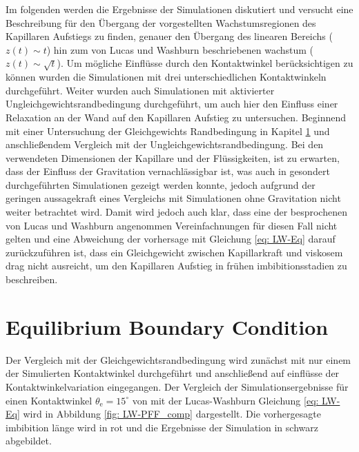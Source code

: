 
Im folgenden werden die Ergebnisse der Simulationen diskutiert und versucht eine Beschreibung für den Übergang der vorgestellten Wachstumsregionen des Kapillaren Aufstiegs zu finden, genauer den Übergang des linearen Bereichs ($z(t)\sim t$) hin zum von Lucas und Washburn beschriebenen wachstum ($z(t)\sim \sqrt{t}$). Um mögliche Einflüsse durch den Kontaktwinkel berücksichtigen zu können wurden die Simulationen mit drei unterschiedlichen Kontaktwinkeln durchgeführt. Weiter wurden auch Simulationen mit aktivierter Ungleichgewichtsrandbedingung durchgeführt, um auch hier den Einfluss einer Relaxation an der Wand auf den Kapillaren Aufstieg zu untersuchen. Beginnend mit einer Untersuchung der Gleichgewichts Randbedingung in Kapitel \ref{sec: EquilibriumBoundaryCondition} und anschließendem Vergleich mit der Ungleichgewichtsrandbedingung.  
Bei den verwendeten Dimensionen der Kapillare und der Flüssigkeiten, ist zu erwarten, dass der Einfluss der Gravitation vernachlässigbar ist, was auch in gesondert durchgeführten Simulationen gezeigt werden konnte, jedoch aufgrund der geringen aussagekraft eines Vergleichs mit Simulationen ohne Gravitation nicht weiter betrachtet wird. Damit wird jedoch auch klar, dass eine der besprochenen von Lucas und Washburn angenommen Vereinfachnungen für diesen Fall nicht gelten und eine Abweichung der vorhersage mit Gleichung \ref{eq: LW-Eq} darauf zurückzuführen ist, dass ein Gleichgewicht zwischen Kapillarkraft und viskosem drag nicht ausreicht, um den Kapillaren Aufstieg in frühen imbibitionsstadien zu beschreiben.

\section{Equilibrium Boundary Condition}
\label{sec: EquilibriumBoundaryCondition}
Der Vergleich mit der Gleichgewichtsrandbedingung wird zunächst mit nur einem der Simulierten Kontaktwinkel durchgeführt und anschließend auf einflüsse der Kontaktwinkelvariation eingegangen. Der Vergleich der Simulationsergebnisse für einen Kontaktwinkel $\theta_{\mathrm{e}}=15^{\circ}$ von mit der Lucas-Washburn Gleichung \ref{eq: LW-Eq} wird in Abbildung \ref{fig: LW-PFF_comp} dargestellt. Die vorhergesagte imbibition länge wird in rot und die Ergebnisse der Simulation in schwarz abgebildet. 

